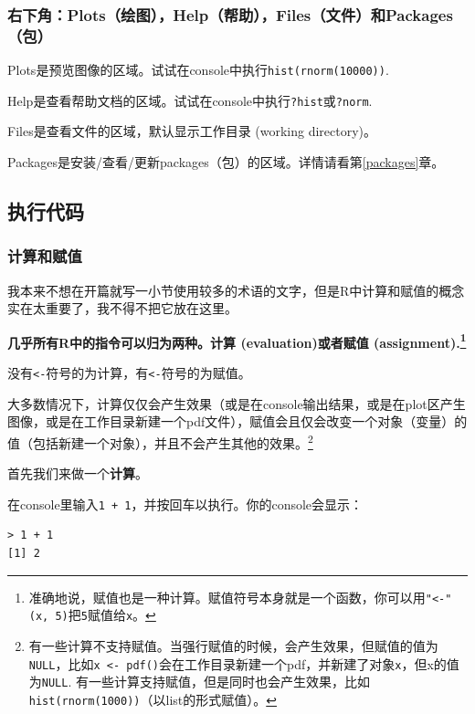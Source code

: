 \documentclass[]{book}
\let\rmarkdownfootnote\footnote%
\def\footnote{\protect\rmarkdownfootnote}
\begin{document}
\hypertarget{bottomright}{%
\subsubsection{右下角：Plots（绘图），Help（帮助），Files（文件）和Packages（包）}\label{bottomright}}

Plots是预览图像的区域。试试在console中执行\texttt{hist(rnorm(10000))}.

Help是查看帮助文档的区域。试试在console中执行\texttt{?hist}或\texttt{?norm}.

Files是查看文件的区域，默认显示工作目录 (working directory)。

Packages是安装/查看/更新packages（包）的区域。详情请看第\ref{packages}章。

\hypertarget{execution}{%
\subsection{执行代码}\label{execution}}

\subsubsection{计算和赋值}

我本来不想在开篇就写一小节使用较多的术语的文字，但是R中计算和赋值的概念实在太重要了，我不得不把它放在这里。

\textbf{几乎所有R中的指令可以归为两种。计算 (evaluation)或者赋值 (assignment).\footnote{准确地说，赋值也是一种计算。赋值符号本身就是一个函数，你可以用\texttt{"\textless{}-"(x,\ 5)}把\texttt{5}赋值给\texttt{x}。}}

没有\texttt{\textless{}-}符号的为计算，有\texttt{\textless{}-}符号的为赋值。

大多数情况下，计算仅仅会产生效果（或是在console输出结果，或是在plot区产生图像，或是在工作目录新建一个pdf文件），赋值会且仅会改变一个对象（变量）的值（包括新建一个对象），并且不会产生其他的效果。\footnote{有一些计算不支持赋值。当强行赋值的时候，会产生效果，但赋值的值为\texttt{NULL}，比如\texttt{x\ \textless{}-\ pdf()}会在工作目录新建一个pdf，并新建了对象\texttt{x}，但x的值为\texttt{NULL}. 有一些计算支持赋值，但是同时也会产生效果，比如\texttt{hist(rnorm(1000))}（以list的形式赋值）。}

首先我们来做一个\textbf{计算}。

在console里输入\texttt{1\ +\ 1}，并按回车以执行。你的console会显示：

\begin{verbatim}
> 1 + 1
[1] 2
\end{verbatim}
\end{document}

